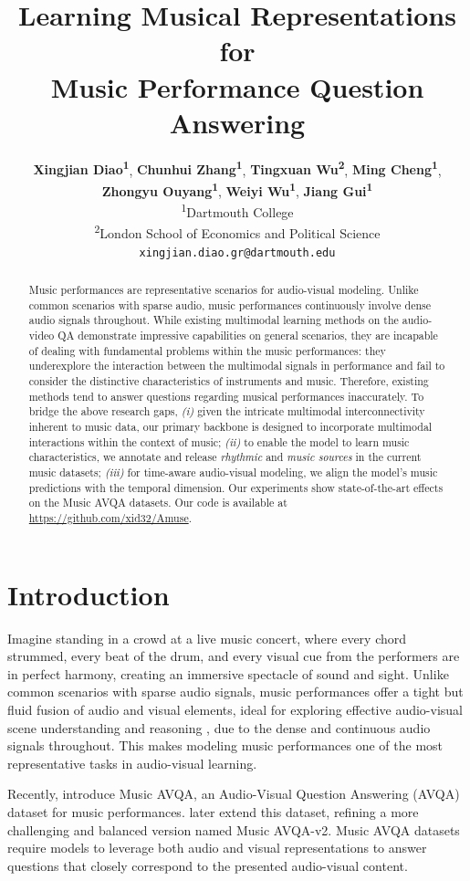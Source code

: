 \documentclass[11pt]{article}
\title{Learning Musical Representations for\\ Music Performance Question Answering}
\author{
 \textbf{Xingjian Diao\textsuperscript{1}},
 \textbf{Chunhui Zhang\textsuperscript{1}},
 \textbf{Tingxuan Wu\textsuperscript{2}},
 \textbf{Ming Cheng\textsuperscript{1}},
\\
 \textbf{Zhongyu Ouyang\textsuperscript{1}},
 \textbf{Weiyi Wu\textsuperscript{1}},
 \textbf{Jiang Gui\textsuperscript{1}}
\\
 \textsuperscript{1}Dartmouth College
 \\
 \textsuperscript{2}London School of Economics and Political Science
\\
   \texttt{xingjian.diao.gr@dartmouth.edu}
}
\begin{document}
\maketitle

\begin{abstract}
Music performances are representative scenarios for audio-visual modeling.
Unlike common scenarios with sparse audio, music performances continuously involve dense audio signals throughout.
While existing multimodal learning methods on the audio-video QA demonstrate impressive capabilities on general scenarios, they are incapable of dealing with fundamental problems within the music performances: they underexplore the interaction between the multimodal signals in performance and fail to consider the distinctive characteristics of instruments and music.
Therefore, existing methods tend to answer questions regarding musical performances inaccurately. 
To bridge the above research gaps, 
\textit{(i)} given the intricate multimodal interconnectivity inherent to music data, our primary backbone is designed to incorporate multimodal interactions within the context of music;
\textit{(ii)} to enable the model to learn music characteristics, we annotate and release \textit{rhythmic} and \textit{music sources} in the current music datasets;
\textit{(iii)} for time-aware audio-visual modeling, we align the model's music predictions with the temporal dimension. Our experiments show state-of-the-art effects on the Music AVQA datasets. Our code is available at \url{https://github.com/xid32/Amuse}.

\end{abstract}


\section{Introduction}
Imagine standing in a crowd at a live music concert, where every chord strummed, every beat of the drum, and every visual cue from the performers are in perfect harmony, creating an immersive spectacle of sound and sight. Unlike common scenarios with sparse audio signals, music performances offer a tight but fluid fusion of audio and visual elements, ideal for exploring effective audio-visual scene understanding and reasoning \cite{li2022learning, liu2024tackling}, due to the dense and continuous audio signals throughout. This makes modeling music performances one of the most representative tasks in audio-visual learning.

Recently, \citet{li2022learning} introduce Music AVQA, an Audio-Visual Question Answering (AVQA) dataset for music performances. \citet{liu2024tackling} later extend this dataset, refining a more challenging and balanced version named Music AVQA-v2. Music AVQA datasets require models to leverage both audio and visual representations to answer questions that closely correspond to the presented audio-visual content.
\end{document}
